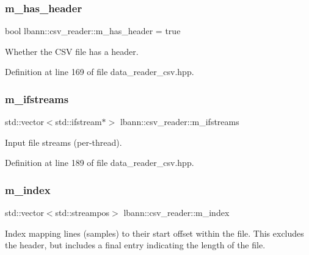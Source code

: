 \subsubsection{\texorpdfstring{m\+\_\+has\+\_\+header}{m\_has\_header}}
{\footnotesize\ttfamily bool lbann\+::csv\+\_\+reader\+::m\+\_\+has\+\_\+header = true\hspace{0.3cm}{\ttfamily [protected]}}



Whether the C\+SV file has a header. 



Definition at line 169 of file data\+\_\+reader\+\_\+csv.\+hpp.

\mbox{\label{classlbann_1_1csv__reader_a41ede08dd2ed420bf8f6c6670d892caf}} 
\subsubsection{\texorpdfstring{m\+\_\+ifstreams}{m\_ifstreams}}
{\footnotesize\ttfamily std\+::vector$<$std\+::ifstream$\ast$$>$ lbann\+::csv\+\_\+reader\+::m\+\_\+ifstreams\hspace{0.3cm}{\ttfamily [protected]}}



Input file streams (per-\/thread). 



Definition at line 189 of file data\+\_\+reader\+\_\+csv.\+hpp.

\mbox{\label{classlbann_1_1csv__reader_a2a959e7839d2d11e2deba98ba1884006}} 
\subsubsection{\texorpdfstring{m\+\_\+index}{m\_index}}
{\footnotesize\ttfamily std\+::vector$<$std\+::streampos$>$ lbann\+::csv\+\_\+reader\+::m\+\_\+index\hspace{0.3cm}{\ttfamily [protected]}}

Index mapping lines (samples) to their start offset within the file. This excludes the header, but includes a final entry indicating the length of the file. 

